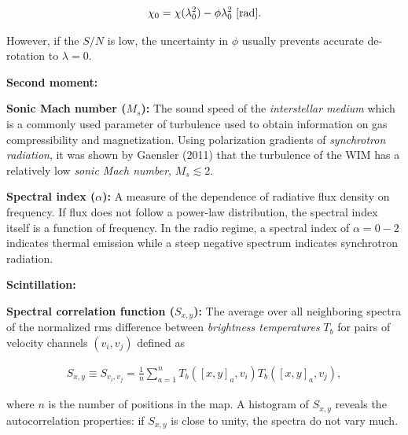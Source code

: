 \documentclass[a4paper,11pt]{article}
\begin{document}
\begin{align*}
    \chi_0 = \chi(\lambda_0^2) - \phi\lambda_0^2 ~ [{\rm rad}].
\end{align*}

{\noindent}However, if the $S/N$ is low, the uncertainty in $\phi$ usually prevents accurate de-rotation to $\lambda=0$. 

{\noindent}\textbf{Second moment:} 

{\noindent}\textbf{Sonic Mach number ($M_s$):} The sound speed of the \textit{interstellar medium} which is a commonly used parameter of turbulence used to obtain information on gas compressibility and magnetization. Using polarization gradients of \textit{synchrotron radiation}, it was shown by Gaensler (2011) that the turbulence of the WIM has a relatively low \textit{sonic Mach number}, $M_s\lesssim2$.

{\noindent}\textbf{Spectral index ($\alpha$):} A measure of the dependence of radiative flux density on frequency. If flux does not follow a power-law distribution, the spectral index itself is a function of frequency. In the radio regime, a spectral index of $\alpha=0-2$ indicates thermal emission while a steep negative spectrum indicates synchrotron radiation.

{\noindent}\textbf{Scintillation:}

{\noindent}\textbf{Spectral correlation function ($S_{x,y}$):} The average over all neighboring spectra of the normalized rms difference between \textit{brightness temperatures} $T_b$ for pairs of velocity channels $(v_i,v_j)$ defined as

\begin{align*}
    S_{x,y} \equiv S_{v_i,v_j} = \frac{1}{n}\sum_{a=1}^n T_b([x,y]_a,v_i)T_b([x,y]_a,v_j),
\end{align*}

{\noindent}where $n$ is the number of positions in the map. A histogram of $S_{x,y}$ reveals the autocorrelation properties: if $S_{x,y}$ is close to unity, the spectra do not vary much.
\end{document}
